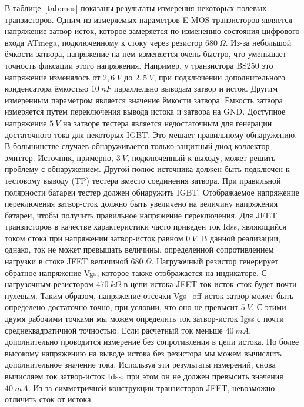 В таблице~\ref{tab:mos} показаны результаты измерения некоторых полевых транзисторов. Одним из измеряемых параметров 
E-MOS транзисторов является напряжение затвор-исток, которое замеряется по изменению состояния цифрового входа ATmega, 
подключенному 
к стоку через резистор \(680~\Omega\).
Из-за небольшой ёмкости затвора, напряжение на нем изменяется
очень быстро, что уменьшает точность фиксации этого напряжения. Например, у транзистора BS250 это напряжение
изменялось от \(2,6~V\) до \(2,5~V\), при подключении дополнительного конденсатора ёмкостью
\(10~nF\) параллельно выводам затвор и исток.
Другим измеренным параметром является значение ёмкости затвора.
Емкость затвора измеряется путем переключения вывода истока и затвора на GND.
Доступное напряжение \(5~V\) на затворе тестера является недостаточным для генерации достаточного тока
для некоторых IGBT. Это мешает правильному обнаружению.
В большинстве случаев обнаруживается только защитный диод коллектор-эмиттер.
Источник, примерно, \(3~V\), подключенный к выходу, может решить проблему с обнаружением.
Другой полюс источника должен быть подключен к тестовому выводу (TP) тестера вместо соединения затвора.
При правильной полярности батареи тестер должен обнаружить IGBT.
Отображаемое напряжение переключения затвор-сток должно быть увеличено на величину напряжения батареи,
чтобы получить правильное напряжение переключения.
Для JFET транзисторов в качестве характеристики часто приведен ток Idss,
являющийся током стока при напряжении затвор-исток равном \(0~V\). В данной реализации, однако, ток не может
превышать величины, определенной сопротивлением нагрузки в стоке JFET величиной \(680~\Omega\).
Нагрузочный резистор генерирует обратное напряжение Vgs, которое также отображается на индикаторе.
С нагрузочным резистором \(470~k\Omega\) в цепи истока JFET ток исток-сток будет почти нулевым.
Таким образом, напряжение отсечки Vgs\_off исток-затвор может быть определено достаточно точно,
при условии, что оно не превысит \(5~V\).
С этими двумя рабочими точками мы можем определить ток затвор-исток Igss с почти среднеквадратичной точностью.
Если расчетный ток меньше \(40~mA\), дополнительно проводится измерение без сопротивления в цепи истока.
По более высокому напряжению на выводе истока без резистора мы можем вычислить дополнительное значение тока.
Используя эти результаты измерений, снова вычисляем ток затвор-исток Idss,
при этом он не должен превысить значения \(40~mA\).
Из-за симметричной конструкции транзисторов JFET, невозможно отличить сток от истока.


